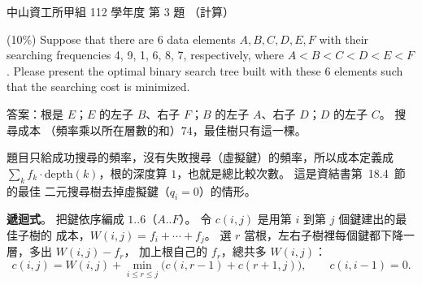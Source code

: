 \begin{pastexam}[label={px:nsysu-112-osds-03}]{中山資工所甲組 112 學年度 第 3 題}
（計算）

(10\%) Suppose that there are 6 data elements $A, B, C, D, E, F$ with their searching frequencies 4, 9,
1, 6, 8, 7, respectively, where $A<B<C<D<E<F$. Please present the optimal binary search tree built with
these 6 elements such that the searching cost is minimized.
\end{pastexam}

\begin{pastsoln}
答案：根是 $E$；$E$ 的左子 $B$、右子 $F$；$B$ 的左子 $A$、右子 $D$；$D$ 的左子 $C$。 搜尋成本
（頻率乘以所在層數的和）$74$，最佳樹只有這一棵。

題目只給成功搜尋的頻率，沒有失敗搜尋（虛擬鍵）的頻率，所以成本定義成
$\sum_k f_k \cdot \text{depth}(k)$，根的深度算 $1$，也就是總比較次數。 這是資結書第~18.4~節的最佳
二元搜尋樹去掉虛擬鍵（$q_i = 0$）的情形。

\textbf{遞迴式}。 把鍵依序編成 $1..6$（$A..F$）。 令 $c(i, j)$ 是用第 $i$ 到第 $j$ 個鍵建出的最佳子樹的
成本，$W(i, j) = f_i + \cdots + f_j$。 選 $r$ 當根，左右子樹裡每個鍵都下降一層，多出 $W(i, j) - f_r$，
加上根自己的 $f_r$，總共多 $W(i, j)$：
\[
c(i, j) = W(i, j) + \min_{i \le r \le j} \bigl(c(i, r-1) + c(r+1, j)\bigr), \qquad c(i, i-1) = 0.
\]


\end{pastsoln}
